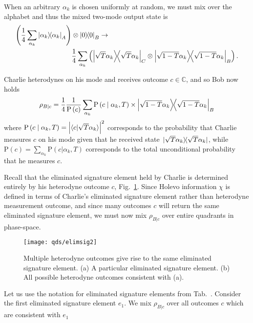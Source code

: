 When an arbitrary $\alpha_k$ is chosen uniformly at random, we must mix over the alphabet and thus the mixed two-mode output state is
\begin{align}
\left(\frac{1}{4}\sum_{\alpha_k} \dyad{\alpha_k}_A\right) &\otimes \dyad{0}_B \rightarrow \notag \\
&\frac{1}{4}\sum_{\alpha_k} \left(\dyad{\sqrt{T}\alpha_k}_C \otimes \dyad{\sqrt{1-T}\alpha_k}_B\right).
\end{align}

\noindent Charlie heterodynes on his mode and receives outcome $c \in \mathbb{C}$, and so Bob now holds
\begin{equation}
\rho_{B | c} = \frac{1}{4}\frac{1}{\text{P}\left(c\right)}\sum_{\alpha_k} \text{P}\left(c \given \alpha_k, T\right) \times \dyad{\sqrt{1-T}\alpha_k}_B
\end{equation}
where $\text{P}\left(c \; \middle| \; \alpha_k, T\right) = \left| \langle c | \sqrt{T}\alpha_k\rangle \right|^2$ corresponds to the probability that Charlie measures $c$ on his mode given that he received state $\dyad*{\sqrt{T}\alpha_k}$, while $\text{P}\left(c\right) = \sum_{\alpha_k} \text{P}\left(c | \alpha_k, T\right)$ corresponds to the total unconditional probability that he measures $c$.

Recall that the eliminated signature element held by Charlie is determined entirely by his heterodyne outcome $c$, Fig.~\ref{fig:qds_elimsig2}. Since Holevo information $\chi$ is defined in terms of Charlie's eliminated signature element rather than heterodyne measurement outcome, and since many outcomes $c$ will return the same eliminated signature element, we must now mix $\rho_{B | c}$ over entire quadrants in phase-space.

\begin{figure}[htp]
\centering
\texttt{[image: qds/elimsig2]}
\caption{\label{fig:qds_elimsig2} Multiple heterodyne outcomes give rise to the same eliminated signature element. (a) A particular eliminated signature element. (b) All possible heterodyne outcomes consistent with (a).}
\end{figure}


Let us use the notation for eliminated signature elements from Tab.~. Consider the first eliminated signature element $e_1$. We mix $\rho_{B | c}$ over all outcomes $c$ which are consistent with $e_1$

